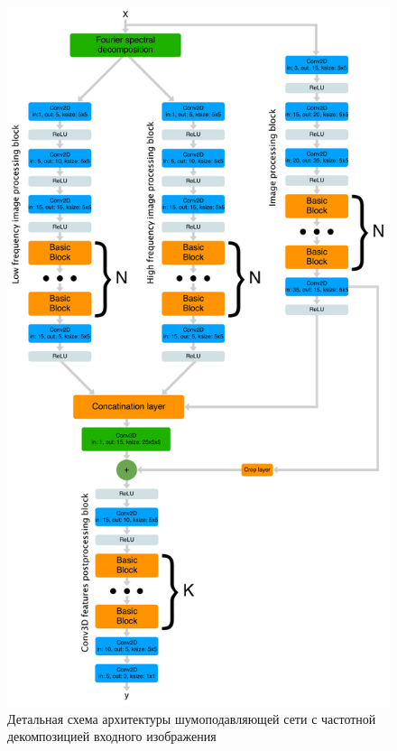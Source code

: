 \documentclass[14pt]{mmcs_article}
\begin{document}
\begin{figure}[H]
	\centering
	\includegraphics[scale=0.055]{img/architecture_fft_decomposition}
	\caption{Детальная схема архитектуры шумоподавляющей сети с частотной декомпозицией входного изображения}
	\label{fig:architecture_fft_decomposition}
\end{figure}
\end{document}
